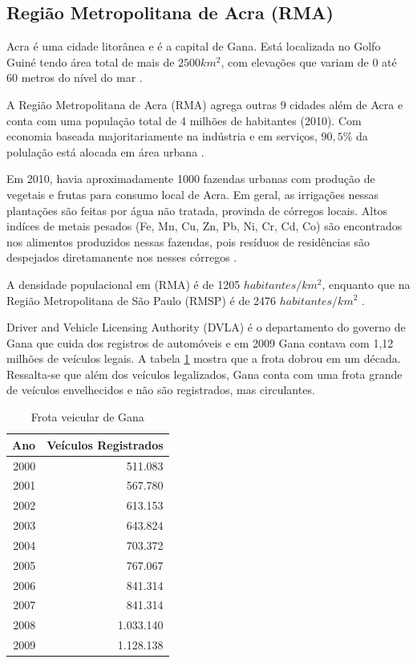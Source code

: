 \subsection{Região Metropolitana de Acra (RMA)}

Acra é uma cidade litorânea e é a capital de Gana. Está localizada 
no Golfo Guiné tendo área total de mais de  $2500 km^2$, com elevações que 
variam de 0 até 60 metros do nível do mar \citep{ARKU2008}.

A Região Metropolitana de Acra (RMA) agrega outras 9 cidades
além de Acra e conta com uma população total de 4 milhões de habitantes (2010). 
Com economia baseada majoritariamente na indústria e em serviços, 
$90,5\%$ da polulação está alocada em área urbana \citep{ghanacensus2013}.

Em 2010, havia aproximadamente 1000 fazendas urbanas com produção de vegetais e
frutas para consumo local de Acra. Em geral, as irrigações nessas plantações
são feitas por água não tratada, provinda de córregos locais. 
Altos indíces de metais pesados (Fe, Mn, Cu, Zn, Pb, Ni, Cr, Cd, Co)
são encontrados nos alimentos produzidos nessas fazendas, pois resíduos de
residências são despejados diretamanente nos nesses córregos \citep{lente2014}.

A densidade populacional em (RMA) é de 1205 $habitantes/km^2$, 
enquanto que na Região Metropolitana de São Paulo (RMSP) é de 
2476 $habitantes/km^2$ \citep{ibge2011}. 

Driver and Vehicle Licensing Authority (DVLA) é o
departamento do governo de Gana que cuida dos registros de automóveis
e em 2009 Gana contava com 1,12 milhões de veículos legais. 
A tabela \ref{table:dvla} mostra que a frota dobrou em um década.
Ressalta-se que além dos veículos legalizados, Gana conta com uma frota grande
de veículos envelhecidos e não são registrados, mas circulantes. 

\begin{table}[H]
 \centering
  \begin{tabular}{rr}
  \hline
  Ano & Veículos Registrados \\ 
  \hline
  2000 & 511.083 \\ 
  2001 & 567.780 \\ 
  2002 & 613.153 \\ 
  2003 & 643.824 \\ 
  2004 & 703.372 \\ 
  2005 & 767.067 \\ 
  2006 & 841.314 \\ 
  2007 & 841.314 \\ 
  2008 & 1.033.140 \\ 
  2009 & 1.128.138 \\ 
  \hline
  \end{tabular}
  \caption{Frota veicular de Gana \citep{dvla} \label{table:dvla}}
\end{table}

